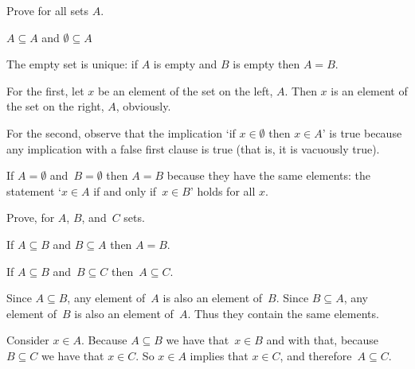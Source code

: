 \documentclass{ibl}  %
\begin{document}
\begin{ex} \label{ex:EmptySetUnique}
Prove for all sets $A$. 
\begin{exes}
\item $A\subseteq A$ and $\emptyset\subseteq A$
\item The empty set is unique: if $A$ is empty and $B$ is empty then $A=B$.
\end{exes}
\begin{ans}
\begin{exes}
\item For the first, let $x$ be an element of the set on the left, $A$.
  Then $x$ is an element of the set on the right, $A$, obviously.

  For the second, observe that the implication 
  `if $x\in\emptyset$ then $x\in A$' is true 
  because any implication with a false first clause is true
  (that is, it is vacuously true).
\item If $A=\emptyset$ and~$B=\emptyset$ then $A=B$ because they have the
  same elements: the statement `$x\in A$ if and only if~$x\in B$' holds   
  for all $x$.
\end{exes}
\end{ans}
\end{ex}

\begin{ex}  \label{ex:PropertiesOfSubset}
Prove, for $A$, $B$, and~$C$ sets.
\begin{exes} 
\item {}
  If $A\subseteq B$ and $B\subseteq A$ then $A=B$.  
\item {}
  If $A\subseteq B$ and~$B\subseteq C$ then~$A\subseteq C$.  
\end{exes}
\begin{ans}
\begin{exes}
\item Since $A\subseteq B$, any element of~$A$ is also an element of~$B$.
   Since $B\subseteq A$, any element of~$B$ is also an element of~$A$.
   Thus they contain the same elements.
\item Consider $x\in A$.
   Because $A\subseteq B$ we have that~$x\in B$ and with that, because
   $B\subseteq C$ we have that $x\in C$.
   So $x\in A$ implies that $x\in C$, and therefore~$A\subseteq C$.
\end{exes}
\end{ans}
\end{ex}
\end{document}
